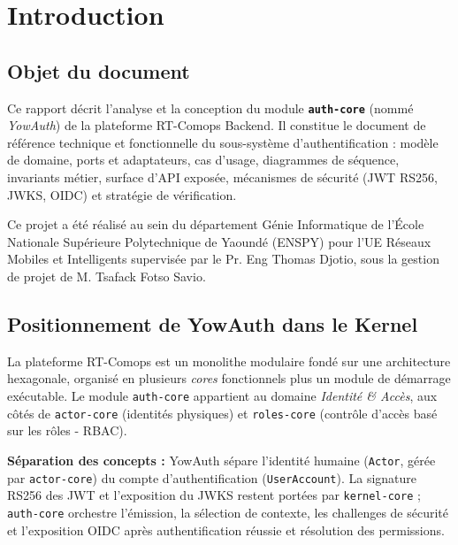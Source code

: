 \documentclass[
]{IPLeiriaThesis}
\newcommand{\code}[1]{\texttt{\small #1}}
\begin{document}
\tableofcontents
\listoffigures
\listoftables
\cleardoublepage


\chapter{Introduction}

\section{Objet du document}
Ce rapport décrit l'analyse et la conception du module \textbf{\code{auth-core}} (nommé \emph{YowAuth}) de la plateforme RT-Comops Backend. Il constitue le document de référence technique et fonctionnelle du sous-système d'authentification : modèle de domaine, ports et adaptateurs, cas d'usage, diagrammes de séquence, invariants métier, surface d'API exposée, mécanismes de sécurité (JWT RS256, JWKS, OIDC) et stratégie de vérification.

Ce projet a été réalisé au sein du département Génie Informatique de l'École Nationale Supérieure Polytechnique de Yaoundé (ENSPY) pour l'UE Réseaux Mobiles et Intelligents supervisée par le Pr. Eng Thomas Djotio, sous la gestion de projet de M. Tsafack Fotso Savio.

\section{Positionnement de YowAuth dans le Kernel}
La plateforme RT-Comops est un monolithe modulaire fondé sur une architecture hexagonale, organisé en plusieurs \emph{cores} fonctionnels plus un module de démarrage exécutable. Le module \code{auth-core} appartient au domaine \emph{Identité \& Accès}, aux côtés de \code{actor-core} (identités physiques) et \code{roles-core} (contrôle d'accès basé sur les rôles - RBAC).

\begin{rolebox}
\textbf{Séparation des concepts :} YowAuth sépare l'identité humaine (\code{Actor}, gérée par \code{actor-core}) du compte d'authentification (\code{UserAccount}). La signature RS256 des JWT et l'exposition du JWKS restent portées par \code{kernel-core} ; \code{auth-core} orchestre l'émission, la sélection de contexte, les challenges de sécurité et l'exposition OIDC après authentification réussie et résolution des permissions.
\end{rolebox}
\end{document}
